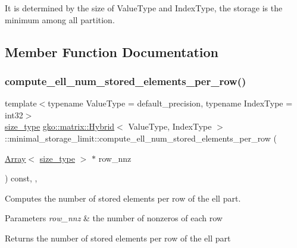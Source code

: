 It is determined by the size of Value\+Type and Index\+Type, the storage is the minimum among all partition. 

\subsection{Member Function Documentation}
\mbox{\label{classgko_1_1matrix_1_1Hybrid_1_1minimal__storage__limit_a381273c294099363637e40cb536fa63a}} 
\subsubsection{\texorpdfstring{compute\+\_\+ell\+\_\+num\+\_\+stored\+\_\+elements\+\_\+per\+\_\+row()}{compute\_ell\_num\_stored\_elements\_per\_row()}}
{\footnotesize\ttfamily template$<$typename Value\+Type = default\+\_\+precision, typename Index\+Type = int32$>$ \\
\hyperlink{namespacegko_a6e5c95df0ae4e47aab2f604a22d98ee7}{size\+\_\+type} \hyperlink{classgko_1_1matrix_1_1Hybrid}{gko\+::matrix\+::\+Hybrid}$<$ Value\+Type, Index\+Type $>$\+::minimal\+\_\+storage\+\_\+limit\+::compute\+\_\+ell\+\_\+num\+\_\+stored\+\_\+elements\+\_\+per\+\_\+row (\begin{DoxyParamCaption}\item[{\hyperlink{classgko_1_1Array}{Array}$<$ \hyperlink{namespacegko_a6e5c95df0ae4e47aab2f604a22d98ee7}{size\+\_\+type} $>$ $\ast$}]{row\+\_\+nnz }\end{DoxyParamCaption}) const\hspace{0.3cm}{\ttfamily [inline]}, {\ttfamily [override]}, {\ttfamily [virtual]}}



Computes the number of stored elements per row of the ell part. 


\begin{DoxyParams}{Parameters}
{\em row\+\_\+nnz} & the number of nonzeros of each row\\
\hline
\end{DoxyParams}
\begin{DoxyReturn}{Returns}
the number of stored elements per row of the ell part 
\end{DoxyReturn}


